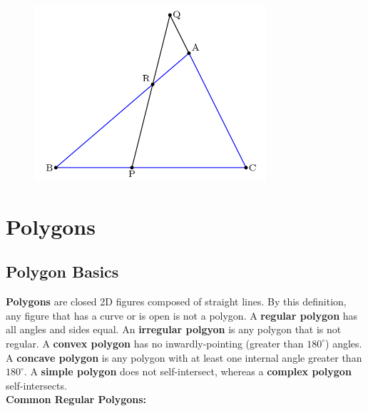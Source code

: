 \documentclass{article}
\begin{document}
            \begin{figure} [hbt!]
                \centering
                \includegraphics[scale=0.75]{Resources/Unit2Triangles/menelaus.PNG}
            \end{figure}

    \pagebreak

    \section{Polygons}

        \subsection{Polygon Basics}
            \textbf{Polygons} are closed 2D figures composed of straight lines. By this definition,
            any figure that has a curve or is open is not a polygon. A \textbf{regular polygon} has
            all angles and sides equal. An \textbf{irregular polgyon} is any polygon that is not
            regular. A \textbf{convex polygon} has no inwardly-pointing (greater than $180^\circ$)
            angles. A \textbf{concave polygon} is any polygon with at least one internal angle
            greater than $180^\circ$. A \textbf{simple polygon} does not self-intersect, whereas a
            \textbf{complex polygon} self-intersects. \\

            \noindent \color{purple} \textbf{Common Regular Polygons:} \color{black} \\
\end{document}
